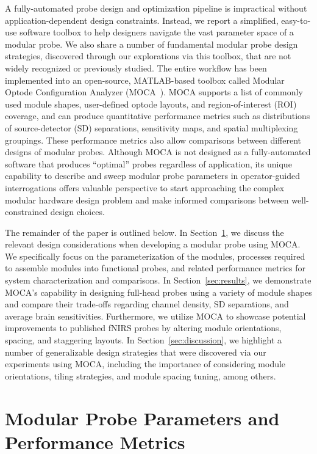 A fully-automated probe design and optimization pipeline is impractical without application-dependent design constraints. Instead, we report a simplified, easy-to-use software toolbox to help designers navigate the vast parameter space of a modular probe. We also share a number of fundamental modular probe design strategies, discovered through our explorations via this toolbox, that are not widely recognized or previously studied. The entire workflow has been implemented into an open-source, MATLAB-based toolbox called Modular Optode Configuration Analyzer (MOCA~\cite{Vanegas2020}). \ac{MOCA} supports a list of commonly used module shapes, user-defined optode layouts, and region-of-interest (ROI) coverage, and can produce quantitative performance metrics such as distributions of source-detector (SD) separations, sensitivity maps, and spatial multiplexing groupings. These performance metrics also allow comparisons between different designs of modular probes. Although \ac{MOCA} is not designed as a fully-automated software that produces ``optimal'' probes regardless of application, its unique capability to describe and sweep modular probe parameters in operator-guided interrogations offers valuable perspective to start approaching the complex modular hardware design problem and make informed comparisons between well-constrained design choices.

The remainder of the paper is outlined below. In Section~\ref{sec:overview}, we discuss the relevant design considerations when developing a modular probe using \ac{MOCA}. We specifically focus on the parameterization of the modules, processes required to assemble modules into functional probes, and related performance metrics for system characterization and comparisons. In Section~\ref{sec:results}, we demonstrate MOCA's capability in designing full-head probes using a variety of module shapes and compare their trade-offs regarding channel density, SD separations, and average brain sensitivities. Furthermore, we utilize MOCA to showcase potential improvements to published \ac{fNIRS} probes by altering module orientations, spacing, and staggering layouts. In Section~\ref{sec:discussion}, we highlight a number of generalizable design strategies that were discovered via our experiments using MOCA, including the importance of considering module orientations, tiling strategies, and module spacing tuning, among others.



\section{Modular Probe Parameters and Performance Metrics}
\label{sec:overview}

